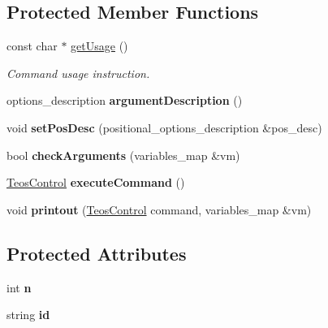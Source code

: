 \subsection*{Protected Member Functions}
\begin{DoxyCompactItemize}
\item 
const char $\ast$ \mbox{\hyperlink{classteos_1_1command_1_1_get_block_options_a85970d4f6337e594d2ac0756f67c50f7}{get\+Usage}} ()
\begin{DoxyCompactList}\small\item\em Command \textquotesingle{}usage\textquotesingle{} instruction. \end{DoxyCompactList}\item 
\mbox{\label{classteos_1_1command_1_1_get_block_options_a5a68a8f531b223e6a9d3ee72333310c8}} 
options\+\_\+description {\bfseries argument\+Description} ()
\item 
\mbox{\label{classteos_1_1command_1_1_get_block_options_abce9cbc2c1454d56975ad12be740bd8f}} 
void {\bfseries set\+Pos\+Desc} (positional\+\_\+options\+\_\+description \&pos\+\_\+desc)
\item 
\mbox{\label{classteos_1_1command_1_1_get_block_options_a081cfcc951b0f47a30dea915c9daea5e}} 
bool {\bfseries check\+Arguments} (variables\+\_\+map \&vm)
\item 
\mbox{\label{classteos_1_1command_1_1_get_block_options_a58079b3a605d0873679df019e882ead3}} 
\mbox{\hyperlink{classteos_1_1_teos_control}{Teos\+Control}} {\bfseries execute\+Command} ()
\item 
\mbox{\label{classteos_1_1command_1_1_get_block_options_a5e74ced61b77ec00dc565baa269dee02}} 
void {\bfseries printout} (\mbox{\hyperlink{classteos_1_1_teos_control}{Teos\+Control}} command, variables\+\_\+map \&vm)
\end{DoxyCompactItemize}
\subsection*{Protected Attributes}
\begin{DoxyCompactItemize}
\item 
\mbox{\label{classteos_1_1command_1_1_get_block_options_ad39586d70ad06d302556ccbc65a32171}} 
int {\bfseries n}
\item 
\mbox{\label{classteos_1_1command_1_1_get_block_options_aca9d966ac2b724944a3e664689e68995}} 
string {\bfseries id}
\end{DoxyCompactItemize}
